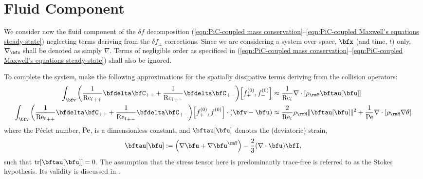 \chapter{Fluid Component}




    
    We consider now the fluid component of the $\delta\!f$ decomposition (\ref{eqn:PiC-coupled mass conservation}--\ref{eqn:PiC-coupled Maxwell's equations steady-state}) neglecting terms deriving from the $\delta\!f_{\pm}$ corrections. Since we are considering a system over space, $\bfx$ (and time, $t$) only, $\nabla_{\bfx}$ shall be denoted as simply $\nabla$. Terms of negligible order as specificed in (\ref{eqn:PiC-coupled mass conservation}--\ref{eqn:PiC-coupled Maxwell's equations steady-state}) shall also be ignored.
    
    To complete the system, make the following approximations for the spatially dissipative terms deriving from the collision operators:
    \begin{align}
        \int_{\bfv}\left(\frac{1}{{\rmRef}_{++}}\bfdelta\bfC_{++} + \frac{1}{{\rmRef}_{+-}}\bfdelta\bfC_{+-}\right)\!\left[f_{+}^{(0)}, f_{-}^{(0)}\right]                    &\approx  \frac{1}{\rmRef}\nabla\cdot[\rho_{\rmM}\bftau[\bfu]]  \\
        \int_{\bfv}\left(\frac{1}{{\rmRef}_{++}}\bfdelta\bfC_{++} + \frac{1}{{\rmRef}_{+-}}\bfdelta\bfC_{+-}\right)\!\left[f_{+}^{(0)}, f_{-}^{(0)}\right]\cdot(\bfv - \bfu)  &\approx  \frac{2}{\rmRef}\rho_{\rmM}\|\bftau[\bfu]\|^{2} + \frac{1}{\rmPe}\nabla\cdot[\rho_{\rmM}\nabla\theta]
    \end{align}
    where the Péclet number, $\mathrm{Pe}$, is a dimensionless constant, and $\bftau[\bfu]$ denotes the (deviatoric) strain,
    \begin{equation}\label{eqn:strain equation}
        \bftau[\bfu]  :=  \left(\nabla\bfu + \nabla\bfu^{\rmT}\right) - \frac{2}{3}(\nabla\cdot\bfu)\bfI,
    \end{equation}
    such that $\tr[\bftau[\bfu]]  =  0$. The assumption that the stress tensor here is predominantly trace-free is referred to as the Stokes hypothesis. \cite{Stokes_1845} Its validity is discussed in \cite{Vincenti_Kruger_1975}.

